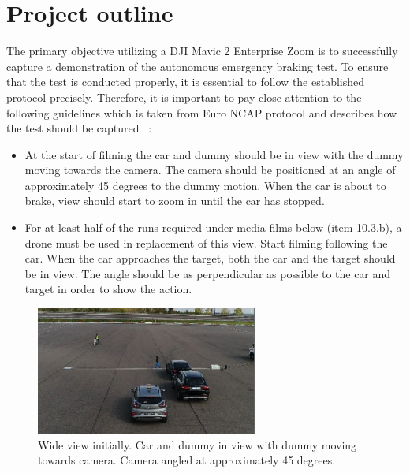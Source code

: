 \section{Project outline}
The primary objective utilizing a DJI Mavic 2 Enterprise Zoom is to successfully capture a demonstration of the autonomous emergency braking test. To ensure that the test is conducted properly, it is essential to follow the established protocol precisely. Therefore, it is important to pay close attention to the following guidelines which is taken from Euro NCAP protocol and describes how the test should be captured
~\cite{EuroNCAP2021EUROPEANPROTOCOL}:
\begin{itemize}
    \item At the start of filming the car and dummy should be in view with the dummy moving towards the camera. The camera should be positioned at an angle of approximately 45 degrees to the dummy motion. When the car is about to brake, view should start to zoom in until the car has stopped.
    \item For at least half of the runs required under media films below (item 10.3.b), a drone must be used in replacement of this view. Start filming following the car. When the car approaches the target, both the car and the target should be in view. The angle should be as perpendicular as possible to the car and target in order to show the action.
\end{itemize}


\begin{figure}[h!]
\centering
 \includegraphics[width=0.65\textwidth,angle =0]{figure/45_degree_angle_of_abs_test.png}
\caption{Wide view initially.
Car and dummy in view with dummy moving towards camera. Camera angled at approximately 
45 degrees.}
\end{figure}


